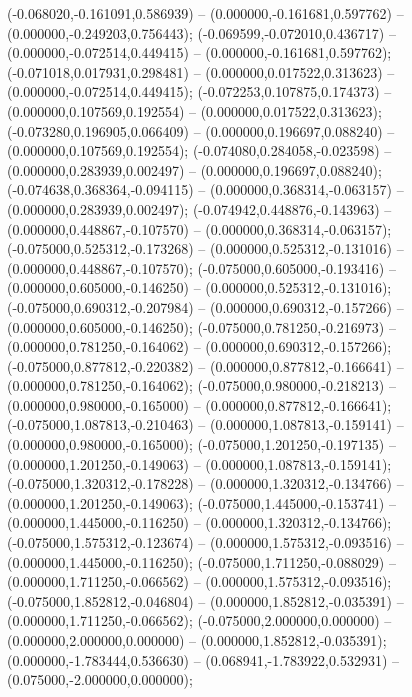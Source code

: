  (-0.068020,-0.161091,0.586939) -- (0.000000,-0.161681,0.597762) -- (0.000000,-0.249203,0.756443);
 (-0.069599,-0.072010,0.436717) -- (0.000000,-0.072514,0.449415) -- (0.000000,-0.161681,0.597762);
 (-0.071018,0.017931,0.298481) -- (0.000000,0.017522,0.313623) -- (0.000000,-0.072514,0.449415);
 (-0.072253,0.107875,0.174373) -- (0.000000,0.107569,0.192554) -- (0.000000,0.017522,0.313623);
 (-0.073280,0.196905,0.066409) -- (0.000000,0.196697,0.088240) -- (0.000000,0.107569,0.192554);
 (-0.074080,0.284058,-0.023598) -- (0.000000,0.283939,0.002497) -- (0.000000,0.196697,0.088240);
 (-0.074638,0.368364,-0.094115) -- (0.000000,0.368314,-0.063157) -- (0.000000,0.283939,0.002497);
 (-0.074942,0.448876,-0.143963) -- (0.000000,0.448867,-0.107570) -- (0.000000,0.368314,-0.063157);
 (-0.075000,0.525312,-0.173268) -- (0.000000,0.525312,-0.131016) -- (0.000000,0.448867,-0.107570);
 (-0.075000,0.605000,-0.193416) -- (0.000000,0.605000,-0.146250) -- (0.000000,0.525312,-0.131016);
 (-0.075000,0.690312,-0.207984) -- (0.000000,0.690312,-0.157266) -- (0.000000,0.605000,-0.146250);
 (-0.075000,0.781250,-0.216973) -- (0.000000,0.781250,-0.164062) -- (0.000000,0.690312,-0.157266);
 (-0.075000,0.877812,-0.220382) -- (0.000000,0.877812,-0.166641) -- (0.000000,0.781250,-0.164062);
 (-0.075000,0.980000,-0.218213) -- (0.000000,0.980000,-0.165000) -- (0.000000,0.877812,-0.166641);
 (-0.075000,1.087813,-0.210463) -- (0.000000,1.087813,-0.159141) -- (0.000000,0.980000,-0.165000);
 (-0.075000,1.201250,-0.197135) -- (0.000000,1.201250,-0.149063) -- (0.000000,1.087813,-0.159141);
 (-0.075000,1.320312,-0.178228) -- (0.000000,1.320312,-0.134766) -- (0.000000,1.201250,-0.149063);
 (-0.075000,1.445000,-0.153741) -- (0.000000,1.445000,-0.116250) -- (0.000000,1.320312,-0.134766);
 (-0.075000,1.575312,-0.123674) -- (0.000000,1.575312,-0.093516) -- (0.000000,1.445000,-0.116250);
 (-0.075000,1.711250,-0.088029) -- (0.000000,1.711250,-0.066562) -- (0.000000,1.575312,-0.093516);
 (-0.075000,1.852812,-0.046804) -- (0.000000,1.852812,-0.035391) -- (0.000000,1.711250,-0.066562);
 (-0.075000,2.000000,0.000000) -- (0.000000,2.000000,0.000000) -- (0.000000,1.852812,-0.035391);
 (0.000000,-1.783444,0.536630) -- (0.068941,-1.783922,0.532931) -- (0.075000,-2.000000,0.000000);
